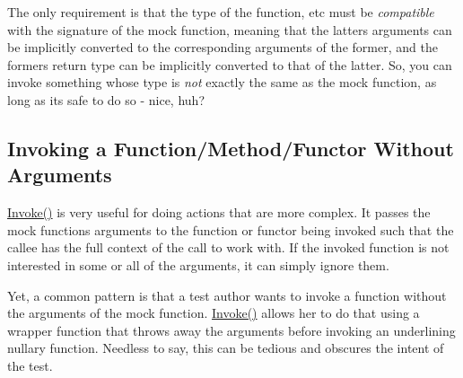 \begin{DoxyCode}{0}
\DoxyCodeLine{}
\DoxyCodeLine{\};}
\DoxyCodeLine{}
\DoxyCodeLine{}
\DoxyCodeLine{\};}
\DoxyCodeLine{}
\DoxyCodeLine{}
\end{DoxyCode}


The only requirement is that the type of the function, etc must be {\itshape compatible} with the signature of the mock function, meaning that the latter\textquotesingle{}s arguments can be implicitly converted to the corresponding arguments of the former, and the former\textquotesingle{}s return type can be implicitly converted to that of the latter. So, you can invoke something whose type is {\itshape not} exactly the same as the mock function, as long as it\textquotesingle{}s safe to do so -\/ nice, huh?

\subsection*{Invoking a Function/\+Method/\+Functor Without Arguments}

{\ttfamily \mbox{\hyperlink{namespacetesting_af5cacf4475557b5a3e37af3836564235}{Invoke()}}} is very useful for doing actions that are more complex. It passes the mock function\textquotesingle{}s arguments to the function or functor being invoked such that the callee has the full context of the call to work with. If the invoked function is not interested in some or all of the arguments, it can simply ignore them.

Yet, a common pattern is that a test author wants to invoke a function without the arguments of the mock function. {\ttfamily \mbox{\hyperlink{namespacetesting_af5cacf4475557b5a3e37af3836564235}{Invoke()}}} allows her to do that using a wrapper function that throws away the arguments before invoking an underlining nullary function. Needless to say, this can be tedious and obscures the intent of the test.

